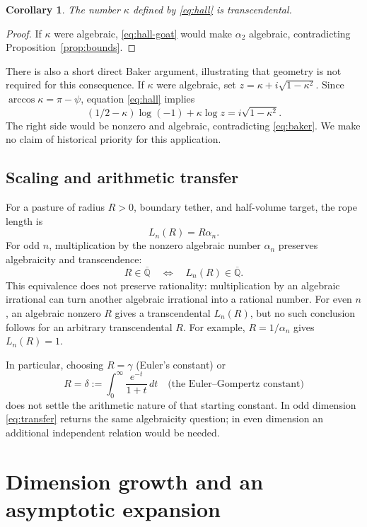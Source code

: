 \documentclass[11pt,a4paper]{article}
\numberwithin{equation}{section}
\newtheorem{corollary}[theorem]{Corollary}
\theoremstyle{definition}
\theoremstyle{remark}
\newcommand{\Qbar}{\overline{\mathbb Q}}
\begin{document}
\begin{corollary}\label{cor:hall}
The number $\kappa$ defined by \eqref{eq:hall} is transcendental.
\end{corollary}
\begin{proof}
If $\kappa$ were algebraic, \eqref{eq:hall-goat} would make $\alpha_2$ algebraic, contradicting Proposition~\ref{prop:bounds}.
\end{proof}

There is also a short direct Baker argument, illustrating that geometry is not required for this consequence. If $\kappa$ were algebraic, set $z=\kappa+i\sqrt{1-\kappa^2}$. Since $\arccos\kappa=\pi-\psi$, equation \eqref{eq:hall} implies
\[
 (1/2-\kappa)\log(-1)+\kappa\log z=i\sqrt{1-\kappa^2}.
\]
The right side would be nonzero and algebraic, contradicting \eqref{eq:baker}. We make no claim of historical priority for this application.

\subsection{Scaling and arithmetic transfer}

For a pasture of radius $R>0$, boundary tether, and half-volume target, the rope length is
\begin{equation}\label{eq:scaling}
 L_n(R)=R\alpha_n.
\end{equation}
For odd $n$, multiplication by the nonzero algebraic number $\alpha_n$ preserves algebraicity and transcendence:
\begin{equation}\label{eq:transfer}
 R\in\Qbar\quad\Longleftrightarrow\quad L_n(R)\in\Qbar.
\end{equation}
This equivalence does not preserve rationality: multiplication by an algebraic irrational can turn another algebraic irrational into a rational number. For even $n$, an algebraic nonzero $R$ gives a transcendental $L_n(R)$, but no such conclusion follows for an arbitrary transcendental $R$. For example, $R=1/\alpha_n$ gives $L_n(R)=1$.

In particular, choosing $R=\gamma$ (Euler's constant) or
\[
 R=\delta:=\int_0^\infty\frac{e^{-t}}{1+t}\,dt
 \quad\text{(the Euler--Gompertz constant)}
\]
does not settle the arithmetic nature of that starting constant. In odd dimension \eqref{eq:transfer} returns the same algebraicity question; in even dimension an additional independent relation would be needed.

\section{Dimension growth and an asymptotic expansion}\label{sec:asymptotic}
\end{document}
